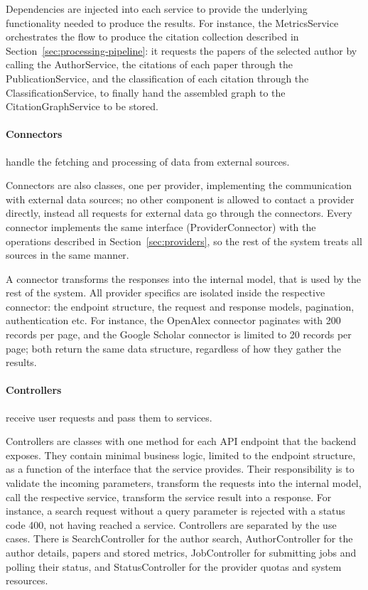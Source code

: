 Dependencies are injected into each service to provide the underlying functionality needed to produce the results.
For instance, the \textsf{MetricsService} orchestrates the flow to produce the citation collection described in Section~\ref{sec:processing-pipeline}: it requests the papers of the selected author by calling the \textsf{AuthorService}, the citations of each paper through the \textsf{PublicationService}, and the classification of each citation through the \textsf{ClassificationService}, to finally hand the assembled graph to the \textsf{CitationGraphService} to be stored.

\paragraph{Connectors} handle the fetching and processing of data from external sources.

Connectors are also classes, one per provider, implementing the communication with external data sources; no other component is allowed to contact a provider directly, instead all requests for external data go through the connectors.
Every connector implements the same interface (\textsf{ProviderConnector}) with the operations described in Section~\ref{sec:providers}, so the rest of the system treats all sources in the same manner.

A connector transforms the responses into the internal model, that is used by the rest of the system.
All provider specifics are isolated inside the respective connector: the endpoint structure, the request and response models, pagination, authentication etc.
For instance, the \textsf{OpenAlex} connector paginates with 200 records per page, and the \textsf{Google Scholar} connector is limited to 20 records per page; both return the same data structure, regardless of how they gather the results.

\paragraph{Controllers} receive user requests and pass them to services.

Controllers are classes with one method for each API endpoint that the backend exposes.
They contain minimal business logic, limited to the endpoint structure, as a function of the interface that the service provides.
Their responsibility is to validate the incoming parameters, transform the requests into the internal model, call the respective service, transform the service result into a response.
For instance, a search request without a query parameter is rejected with a status code \textsf{400}, not having reached a service.
Controllers are separated by the use cases.
There is \textsf{SearchController} for the author search, \textsf{AuthorController} for the author details, papers and stored metrics, \textsf{JobController} for submitting jobs and polling their status, and \textsf{StatusController} for the provider quotas and system resources.


